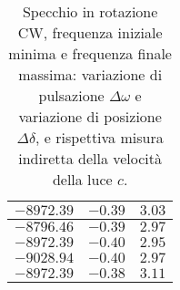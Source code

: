 \documentclass[]{article}
\begin{document}
\begin{table}
\begin{tabular}{||c|c|c||}
            $-8972.39$ & $-0.39$ & $3.03$ \\\hline
            $-8796.46$ & $-0.39$ & $2.97$ \\\hline
            $-8972.39$ & $-0.40$ & $2.95$ \\\hline
            $-9028.94$ & $-0.40$ & $2.97$ \\\hline
            $-8972.39$ & $-0.38$ & $3.11$ \\\hline
        \end{tabular}
        \caption{Specchio in rotazione CW, frequenza iniziale minima e frequenza finale massima: variazione di pulsazione $\Delta\omega$ e variazione di posizione $\Delta\delta$, e rispettiva misura indiretta della velocità della luce $c$.}
        \label{CW_min_max-c}
    \end{table}
\end{document}
